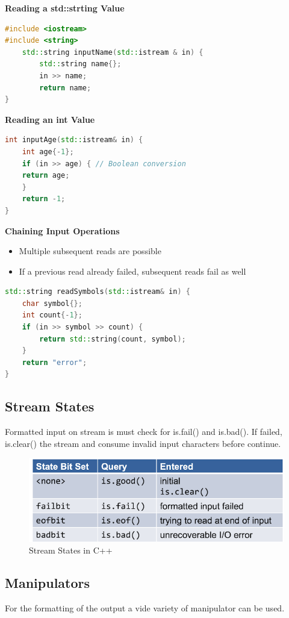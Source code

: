 \textbf{Reading a std::strting Value }
\begin{lstlisting}[language=C++]
#include <iostream> 
#include <string>
	std::string inputName(std::istream & in) {
		std::string name{};
		in >> name;
		return name; 
}	
\end{lstlisting}
\textbf{Reading an int Value}
\begin{lstlisting}[language=C++]
int inputAge(std::istream& in) {
	int age{-1};
	if (in >> age) { // Boolean conversion
	return age; 
	} 
	return -1;
}
\end{lstlisting}
\textbf{Chaining Input Operations}
\begin{itemize}
  \itemsep -0.5em 
  \item Multiple subsequent reads are possible 
  \item If a previous read already failed, subsequent reads fail as well
\end{itemize}

\begin{lstlisting}[language=C++]
std::string readSymbols(std::istream& in) {
	char symbol{};
	int count{-1};
	if (in >> symbol >> count) {
		return std::string(count, symbol); 
	} 
	return "error";
}
\end{lstlisting}

\subsection{Stream States}
Formatted input on stream  is must check for is.fail() and is.bad(). If failed, is.clear() the stream and consume invalid input characters before continue.

\begin{figure}[h!]
  \centering
  \includegraphics[width=0.7\linewidth]{images/streamstates}
  \caption{Stream States in C++}
\end{figure}

\subsection{Manipulators}
For the formatting of the output a vide variety of manipulator can be used.

